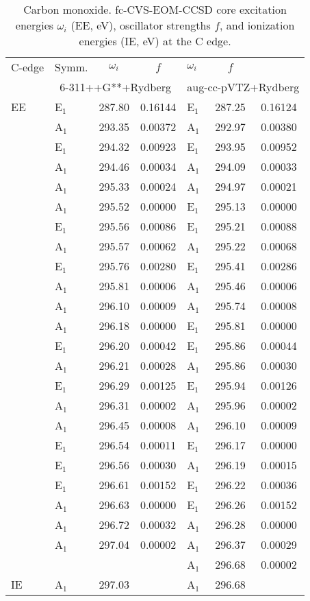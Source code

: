 \documentclass[journal=jctcce,manuscript=article]{achemso}
\begin{document}
\begin{table}
\caption{Carbon monoxide. fc-CVS-EOM-CCSD core excitation energies $\omega_i$ (EE, eV), oscillator strengths $f$, and ionization 
energies (IE, eV) at the C edge.
\label{Tab:CO_C}}
\scriptsize
\begin{tabular}{l|lcc|lcc}
\hline
C-edge & Symm. & $\omega_i$ & $f$ 
       & $\omega_i$ & $f$ \\
\cline{2-7}
      & \multicolumn{3}{c|}{6-311++G**+Rydberg}
      & \multicolumn{3}{c}{aug-cc-pVTZ+Rydberg} \\
\hline
  EE 
& E$_1$ & 287.80 & 0.16144 & E$_1$ & 287.25 & 0.16124 \\
& A$_1$ & 293.35 & 0.00372 & A$_1$ & 292.97 & 0.00380 \\
& E$_1$ & 294.32 & 0.00923 & E$_1$ & 293.95 & 0.00952 \\
& A$_1$ & 294.46 & 0.00034 & A$_1$ & 294.09 & 0.00033 \\
& A$_1$ & 295.33 & 0.00024 & A$_1$ & 294.97 & 0.00021 \\
& A$_1$ & 295.52 & 0.00000 & E$_1$ & 295.13 & 0.00000 \\
& E$_1$ & 295.56 & 0.00086 & E$_1$ & 295.21 & 0.00088 \\
& A$_1$ & 295.57 & 0.00062 & A$_1$ & 295.22 & 0.00068 \\
& E$_1$ & 295.76 & 0.00280 & E$_1$ & 295.41 & 0.00286 \\
& A$_1$ & 295.81 & 0.00006 & A$_1$ & 295.46 & 0.00006 \\
& A$_1$ & 296.10 & 0.00009 & A$_1$ & 295.74 & 0.00008 \\
& A$_1$ & 296.18 & 0.00000 & E$_1$ & 295.81 & 0.00000 \\
& E$_1$ & 296.20 & 0.00042 & E$_1$ & 295.86 & 0.00044 \\
& A$_1$ & 296.21 & 0.00028 & A$_1$ & 295.86 & 0.00030 \\
& E$_1$ & 296.29 & 0.00125 & E$_1$ & 295.94 & 0.00126 \\
& A$_1$ & 296.31 & 0.00002 & A$_1$ & 295.96 & 0.00002 \\
& A$_1$ & 296.45 & 0.00008 & A$_1$ & 296.10 & 0.00009 \\
& E$_1$ & 296.54 & 0.00011 & E$_1$ & 296.17 & 0.00000 \\
& E$_1$ & 296.56 & 0.00030 & A$_1$ & 296.19 & 0.00015 \\
& E$_1$ & 296.61 & 0.00152 & E$_1$ & 296.22 & 0.00036 \\
& A$_1$ & 296.63 & 0.00000 & E$_1$ & 296.26 & 0.00152 \\
& A$_1$ & 296.72 & 0.00032 & A$_1$ & 296.28 & 0.00000 \\
& A$_1$ & 297.04 & 0.00002 & A$_1$ & 296.37 & 0.00029 \\
&&&                        & A$_1$ & 296.68 & 0.00002 \\
\hline
IE & A$_1$ & 297.03&      & A$_1$  & 296.68 &  \\
\hline
  \end{tabular}
\end{table}
\end{document}
